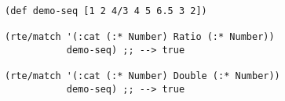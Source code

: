 \begin{lstlisting}[style=reclojureClojure,frame=single]
(def demo-seq [1 2 4/3 4 5 6.5 3 2])

(rte/match '(:cat (:* Number) Ratio (:* Number))
           demo-seq) ;; --> true

(rte/match '(:cat (:* Number) Double (:* Number))
           demo-seq) ;; --> true
\end{lstlisting}
